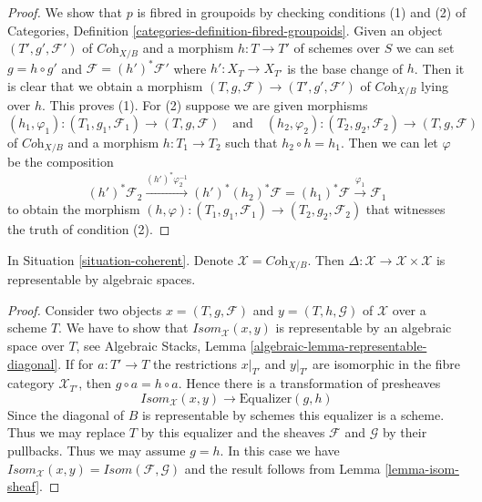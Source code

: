 \begin{proof}
We show that $p$ is fibred in groupoids by checking conditions
(1) and (2) of Categories, Definition
\ref{categories-definition-fibred-groupoids}.
Given an object $(T', g', \mathcal{F}')$
of $\textit{Coh}_{X/B}$ and a morphism $h : T \to T'$ of
schemes over $S$ we can set $g = h \circ g'$ and
$\mathcal{F} = (h')^*\mathcal{F}'$ where $h' : X_T \to X_{T'}$
is the base change of $h$. Then it is clear that we obtain
a morphism $(T, g, \mathcal{F}) \to (T', g', \mathcal{F}')$
of $\textit{Coh}_{X/B}$ lying over $h$. This proves (1).
For (2) suppose we are given morphisms
$$
(h_1, \varphi_1) : (T_1, g_1, \mathcal{F}_1) \to (T, g, \mathcal{F})
\quad\text{and}\quad
(h_2, \varphi_2) : (T_2, g_2, \mathcal{F}_2) \to (T, g, \mathcal{F})
$$
of $\textit{Coh}_{X/B}$ and a morphism $h : T_1 \to T_2$ such that
$h_2 \circ h = h_1$. Then we can let $\varphi$ be the composition
$$
(h')^*\mathcal{F}_2
\xrightarrow{(h')^*\varphi_2^{-1}}
(h')^*(h_2)^*\mathcal{F} = (h_1)^*\mathcal{F}
\xrightarrow{\varphi_1}
\mathcal{F}_1
$$
to obtain the morphism
$(h, \varphi) : (T_1, g_1, \mathcal{F}_1) \to (T_2, g_2, \mathcal{F}_2)$
that witnesses the truth of condition (2).
\end{proof}

\begin{lemma}
\label{lemma-coherent-diagonal}
In Situation \ref{situation-coherent}. Denote
$\mathcal{X} = \textit{Coh}_{X/B}$. Then
$\Delta : \mathcal{X} \to \mathcal{X} \times \mathcal{X}$ is
representable by algebraic spaces.
\end{lemma}

\begin{proof}
Consider two objects $x = (T, g, \mathcal{F})$ and $y = (T, h, \mathcal{G})$
of $\mathcal{X}$ over a scheme $T$. We have to show that
$\mathit{Isom}_\mathcal{X}(x, y)$ is representable by an algebraic
space over $T$, see
Algebraic Stacks, Lemma \ref{algebraic-lemma-representable-diagonal}.
If for $a : T' \to T$ the restrictions $x|_{T'}$ and $y|_{T'}$ are isomorphic
in the fibre category $\mathcal{X}_{T'}$, then $g \circ a = h \circ a$.
Hence there is a transformation of presheaves
$$
\mathit{Isom}_\mathcal{X}(x, y) \longrightarrow \text{Equalizer}(g, h)
$$
Since the diagonal of $B$ is representable by schemes this equalizer is
a scheme. Thus we may replace $T$ by this equalizer and the sheaves
$\mathcal{F}$ and $\mathcal{G}$ by their pullbacks. Thus we may assume
$g = h$. In this case we have
$\mathit{Isom}_\mathcal{X}(x, y) = \mathit{Isom}(\mathcal{F}, \mathcal{G})$
and the result follows from Lemma \ref{lemma-isom-sheaf}.
\end{proof}

